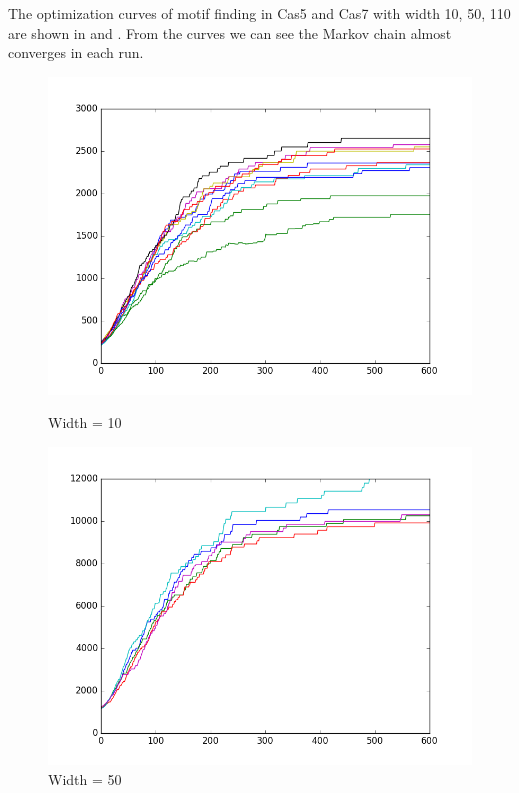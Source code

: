 \documentclass[11pt, oneside]{article}
\begin{document}
The optimization curves of motif finding in Cas5 and Cas7 with width 10, 50, 110 are shown in  and . From the curves we can see the Markov chain almost converges in each run.
\begin{figure}[htbp]
  \centering
  \begin{minipage}{0.32\textwidth}
    \centering
    \includegraphics[width=1\textwidth]{images/cas5_width10_curve} %
    \caption*{Width = 10}
  \end{minipage}
  \hfill
  \begin{minipage}{0.32\textwidth}
    \centering
    \includegraphics[width=1\textwidth]{images/cas5_width50_curve} %
    \caption*{Width = 50}

\end{minipage}
\end{figure}
\end{document}
